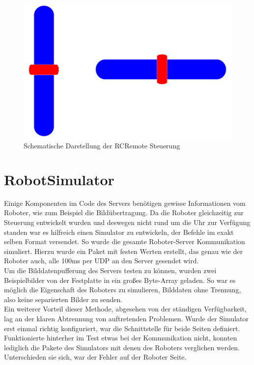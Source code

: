 \begin{figure}[h!]
	\centering
	\includegraphics[height=.25\textheight]{images/android_rcremote.pdf}
	\caption{Schematische Darstellung der RCRemote Steuerung}
	\label{fig:android_rcremote}
\end{figure}



\section{RobotSimulator}
Einige Komponenten im Code des Servers benötigen gewisse Informationen vom Roboter, wie zum Beispiel die Bildübertragung. Da die Roboter gleichzeitig zur Steuerung entwickelt wurden und deswegen nicht rund um die Uhr zur Verfügung standen war es hilfreich einen Simulator zu entwickeln, der Befehle im exakt selben Format versendet. So wurde die gesamte Roboter-Server Kommunikation simuliert. Hierzu wurde ein Paket mit festen Werten erstellt, das genau wie der Roboter auch, alle 100ms per UDP an den Server gesendet wird.\\
Um die Bilddatenpufferung des Servers testen zu können, wurden zwei Beispielbilder von der Festplatte in ein großes Byte-Array geladen. So war es möglich die Eigenschaft des Roboters zu simulieren, Bilddaten ohne Trennung, also keine separierten Bilder zu senden. \\

Ein weiterer Vorteil dieser Methode, abgesehen von der ständigen Verfügbarkeit, lag an der klaren Abtrennung von auftretenden Problemen. Wurde der Simulator erst einmal richtig konfiguriert, war die Schnittstelle für beide Seiten definiert. Funktionierte hinterher im Test etwas bei der Kommunikation nicht, konnten lediglich die Pakete des Simulators mit denen des Roboters verglichen werden. Unterschieden sie sich, war der Fehler auf der Roboter Seite.
